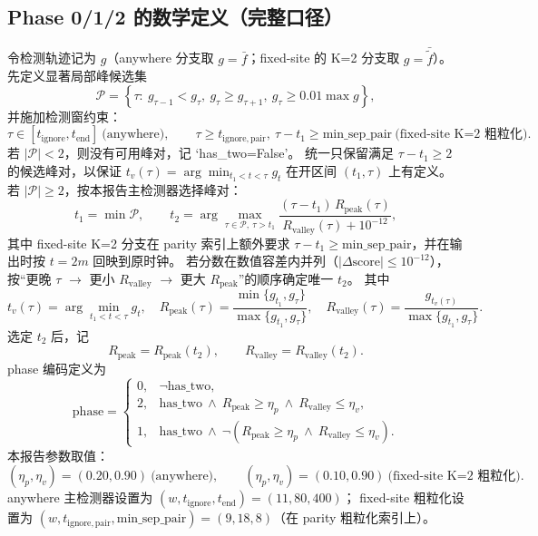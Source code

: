 \documentclass[11pt]{article}
\begin{document}
\subsection*{Phase 0/1/2 的数学定义（完整口径）}
令检测轨迹记为 $g$（anywhere 分支取 $g=\bar f$；fixed-site 的 K=2 分支取 $g=\bar{\widetilde f}$）。
先定义显著局部峰候选集
\[
\mathcal P=\left\{\tau:\ g_{\tau-1}<g_{\tau},\ g_{\tau}\ge g_{\tau+1},\ g_{\tau}\ge 0.01\max g\right\},
\]
并施加检测窗约束：
\[
\tau\in[t_{\mathrm{ignore}},t_{\mathrm{end}}]\ \text{(anywhere)},\qquad
\tau\ge t_{\mathrm{ignore,pair}},\ \tau-t_1\ge\mathrm{min\_sep\_pair}\ \text{(fixed-site K=2 粗粒化)}.
\]
若 $|\mathcal P|<2$，则没有可用峰对，记 `has\_two=False'。
统一只保留满足 $\tau-t_1\ge2$ 的候选峰对，以保证
$t_v(\tau)=\arg\min_{t_1<t<\tau}g_t$ 在开区间 $(t_1,\tau)$ 上有定义。
若 $|\mathcal P|\ge2$，按本报告主检测器选择峰对：
\[
t_1=\min\mathcal P,\qquad
 t_2=\arg\max_{\tau\in\mathcal P,\ \tau>t_1}
\frac{(\tau-t_1)\,R_{\mathrm{peak}}(\tau)}{R_{\mathrm{valley}}(\tau)+10^{-12}},
\]
其中 fixed-site K=2 分支在 parity 索引上额外要求 $\tau-t_1\ge\mathrm{min\_sep\_pair}$，并在输出时按 $t=2m$ 回映到原时钟。
若分数在数值容差内并列（$|\Delta\mathrm{score}|\le10^{-12}$），按“更晚 $\tau$ $\rightarrow$ 更小 $R_{\mathrm{valley}}$ $\rightarrow$ 更大 $R_{\mathrm{peak}}$”的顺序确定唯一 $t_2$。
其中
\[
t_v(\tau)=\arg\min_{t_1<t<\tau}g_t,\quad
R_{\mathrm{peak}}(\tau)=\frac{\min\{g_{t_1},g_{\tau}\}}{\max\{g_{t_1},g_{\tau}\}},\quad
R_{\mathrm{valley}}(\tau)=\frac{g_{t_v(\tau)}}{\max\{g_{t_1},g_{\tau}\}}.
\]
选定 $t_2$ 后，记
\[
R_{\mathrm{peak}}=R_{\mathrm{peak}}(t_2),\qquad
R_{\mathrm{valley}}=R_{\mathrm{valley}}(t_2).
\]
phase 编码定义为
\[
\mathrm{phase}=
\begin{cases}
0,& \neg\mathrm{has\_two},\\
2,& \mathrm{has\_two}\ \land\ R_{\mathrm{peak}}\ge\eta_p\ \land\ R_{\mathrm{valley}}\le\eta_v,\\
1,& \mathrm{has\_two}\ \land\ \neg\!\left(R_{\mathrm{peak}}\ge\eta_p\ \land\ R_{\mathrm{valley}}\le\eta_v\right).
\end{cases}
\]
本报告参数取值：
\[
(\eta_p,\eta_v)=(0.20,0.90)\ \text{(anywhere)},\qquad
(\eta_p,\eta_v)=(0.10,0.90)\ \text{(fixed-site K=2 粗粒化)}.
\]
anywhere 主检测器设置为 $(w,t_{\mathrm{ignore}},t_{\mathrm{end}})=(11,80,400)$；
fixed-site 粗粒化设置为 $(w,t_{\mathrm{ignore,pair}},\mathrm{min\_sep\_pair})=(9,18,8)$（在 parity 粗粒化索引上）。
\end{document}
